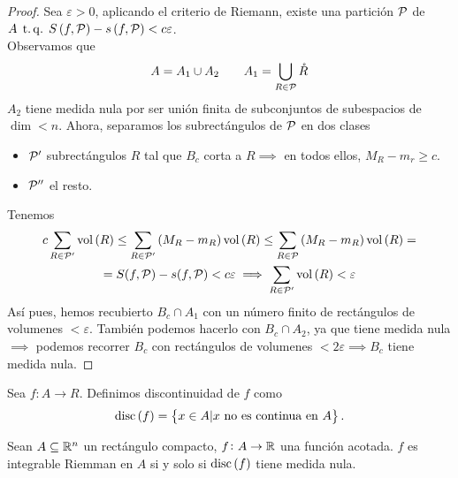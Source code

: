 \begin{proof}
    Sea $\varepsilon > 0$, aplicando el criterio de Riemann, existe una partición $\mathcal{P}$ de $A \operatorname{\;t.q.\;} S \left( f, \mathcal{P} \right) - s \left( f, \mathcal{P} \right) < c\varepsilon$. \\
    Observamos que
    \[
        A = A_1 \cup A_2 \qquad A_1 = \bigcup_{R \in \mathcal{P}} \mathring{R}
    \]
    $A_2$ tiene medida nula por ser unión finita de subconjuntos de subespacios de
    $\dim < n$. Ahora, separamos los subrectángulos de $\mathcal{P}$ en dos clases
    \begin{itemize}
        \item $\mathcal{P}^\prime$ subrectángulos $R$ tal que $B_c$ corta a $R \implies$ en
            todos ellos, $M_R - m_r \geq c$.
        \item $\mathcal{P}^{\prime\prime}$ el resto.
    \end{itemize}
    Tenemos
    \begin{gather*}
        c \sum_{R \in \mathcal{P}^\prime}\operatorname{vol}\left( R \right) \leq
        \sum_{R \in \mathcal{P}^\prime}\left( M_R - m_R \right) \operatorname{vol}\left( R \right) \leq
        \sum_{R \in \mathcal{P}} \left( M_R -m_R \right)\operatorname{vol} \left( R \right) =\\=
        S(f, \mathcal{P}) - s(f, \mathcal{P}) < c\varepsilon \implies \sum_{R \in \mathcal{P}^\prime}
        \operatorname{vol}\left( R \right) < \varepsilon
    \end{gather*}
    Así pues, hemos recubierto $B_c \cap A_1$ con un número finito de rectángulos de
    volumenes $< \varepsilon$. Tambi\'en podemos hacerlo con $B_c \cap A_2$, ya que
    tiene medida nula $\implies$ podemos recorrer $B_c$ con rectángulos de volumenes
    $< 2\varepsilon \implies B_c$ tiene medida nula.
\end{proof}

\begin{defi*}
    Sea $f \colon A \to R$. Definimos discontinuidad de $f$ como
    \[
        \operatorname{disc}\left( f \right) = \left\{x \in A \vert x \text{ no es continua en }A\right\}.
    \]
\end{defi*}

\begin{teo}[de Lebesgue]
    Sean $A \subseteq \mathbb{R}^n$ un rectángulo compacto, $f \colon A \to \mathbb{R}$ una
    función acotada. $f$ es integrable Riemman en $A$ si y solo si
    $\operatorname{disc}\left( f \right)$ tiene medida nula.
\end{teo}

